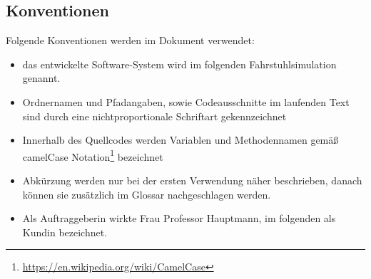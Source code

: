 \subsection*{Konventionen}
Folgende Konventionen werden im Dokument verwendet:\\
\begin{itemize}
	\item das entwickelte Software-System wird im folgenden Fahrstuhlsimulation genannt.
	\item Ordnernamen und Pfadangaben, sowie Codeausschnitte im laufenden Text sind durch eine nichtproportionale Schriftart gekennzeichnet
	\item Innerhalb des Quellcodes werden Variablen und Methodennamen gemäß camelCase Notation\footnote{\url{https://en.wikipedia.org/wiki/CamelCase}} bezeichnet
	\item Abkürzung werden nur bei der ersten Verwendung näher beschrieben, danach können sie zusätzlich im Glossar nachgeschlagen werden.
	\item Als Auftraggeberin wirkte Frau Professor Hauptmann, im folgenden als Kundin bezeichnet.
\end{itemize}
